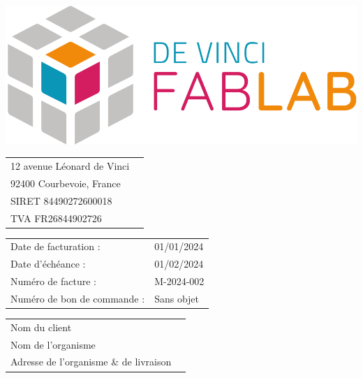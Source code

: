 \documentclass[12pt,a4paper]{article}
\begin{document}
\thispagestyle{empty}


\begin{minipage}{0.39\textwidth}
    \includegraphics[width=0.7\linewidth]{../assets/logo_fablab.png}

    \vspace{0.5cm}

    \begin{tabular}{ll}
        12 avenue Léonard de Vinci \\
        92400 Courbevoie, France   \\
        SIRET 84490272600018       \\
        TVA  FR26844902726         \\
    \end{tabular}
\end{minipage}
\begin{minipage}{0.6\textwidth}
    \begin{flushright}
        \begin{tabular}{ll}
            Date de facturation :       & 01/01/2024 \\
            Date d'échéance :           & 01/02/2024 \\
            Numéro de facture :         & M-2024-002 \\
            Numéro de bon de commande : & Sans objet \\
        \end{tabular}
    \end{flushright}
\end{minipage}
\begin{flushright}
    \begin{minipage}[t]{0.5\textwidth}
        \begin{framed}
            \begin{tabular}{ll}
                Nom du client                          \\
                Nom de l'organisme                     \\
                Adresse de l'organisme \& de livraison \\
            \end{tabular}
        \end{framed}
    \end{minipage}
\end{flushright}
\end{document}

